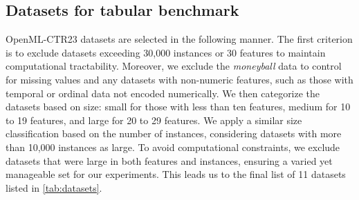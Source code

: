 \documentclass{article}
\begin{document}
\newpage
\begin{appendix}
\section{Datasets for tabular benchmark}
\label{appendix:semf-databench}
OpenML-CTR23 \cite{fischer2023} datasets are selected in the following manner. The first criterion is to exclude datasets exceeding 30,000 instances or 30 features to maintain computational tractability. Moreover, we exclude the \textit{moneyball} data \cite{kaggle2017moneyball} to control for missing values and any datasets with non-numeric features, such as those with temporal or ordinal data not encoded numerically. We then categorize the datasets based on size: small for those with less than ten features, medium for 10 to 19 features, and large for 20 to 29 features. We apply a similar size classification based on the number of instances, considering datasets with more than 10,000 instances as large. To avoid computational constraints, we exclude datasets that were large in both features and instances, ensuring a varied yet manageable set for our experiments. This leads us to the final list of 11 datasets listed in \autoref{tab:datasets}.


\end{appendix}
\end{document}
